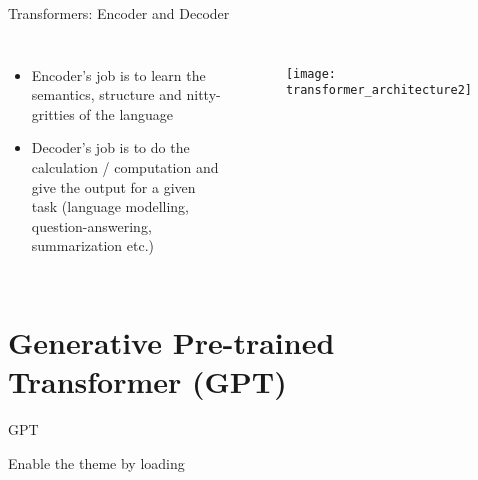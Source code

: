 \documentclass[10pt]{beamer}
\begin{document}
\begin{frame}[fragile]{Transformers: Encoder and Decoder}

	\begin{columns}[c]
		\begin{itemize}
			\item Encoder's job is to learn the semantics, structure and nitty-gritties of the language
			\item Decoder's job is to do the calculation / computation and give the output for a given task (language
			      modelling, question-answering, summarization etc.)
		\end{itemize}
		\begin{figure}[h]
			\centering
			\texttt{[image: transformer\_architecture2]}
		\end{figure}
	\end{columns}

\end{frame}


\section[Generative Pre-trained Transformer (GPT)]{Generative Pre-trained Transformer (GPT)}

\begin{frame}[fragile]{GPT}

	Enable the theme by loading

\end{frame}

%
%
%
%
%
%
\end{document}
